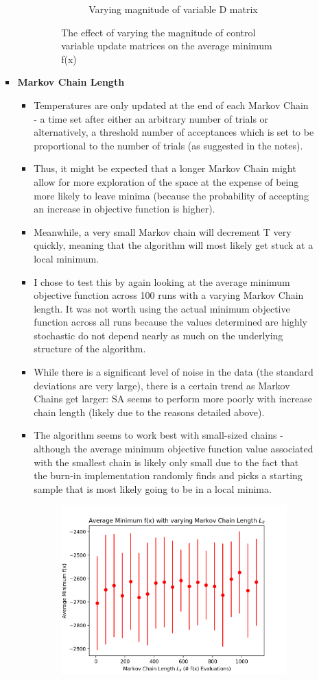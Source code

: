 \documentclass[12pt]{article}
\begin{document}
\begin{enumerate}
\begin{enumerate}
\begin{itemize}
\begin{itemize}
\begin {figure}[H]
\begin{subfigure}{8cm}
		\caption{Varying magnitude of variable D matrix}
		\end{subfigure}
		\caption{The effect of varying the magnitude of control variable update matrices on the average minimum f(x)}
		\label{fig8}
		\end{figure}
		\end{itemize}
		\pagebreak
		\item \textbf{Markov Chain Length}
		\begin{itemize}
		\item Temperatures are only updated at the end of each Markov Chain - a time set after either an arbitrary number of trials or alternatively, a threshold number of acceptances which is set to be proportional to the number of trials (as suggested in the notes).
		\item Thus, it might be expected that a longer Markov Chain might allow for more exploration of the space at the expense of being more likely to leave minima (because the probability of accepting an increase in objective function is higher).
		\item Meanwhile, a very small Markov chain will decrement T very quickly, meaning that the algorithm will most likely get stuck at a local minimum.
		\item I chose to test this by again looking at the average minimum objective function across 100 runs with a varying Markov Chain length. It was not worth using the actual minimum objective function across all runs because the values determined are highly stochastic do not depend nearly as much on the underlying structure of the algorithm.
		\item While there is a significant level of noise in the data (the standard deviations are very large), there is a certain trend as Markov Chains get larger: SA seems to perform more poorly with increase chain length (likely due to the reasons detailed above). 
		\item The algorithm seems to work best with small-sized chains - although the average minimum objective function value associated with the smallest chain is likely only small due to the fact that the burn-in implementation randomly finds and picks a starting sample that is most likely going to be in a local minima.	\begin{figure}[H]
		\centering
		\includegraphics[width=9cm]{a_l_k}

\end{figure}
\end{itemize}
\end{itemize}
\end{enumerate}
\end{enumerate}
\end{document}
